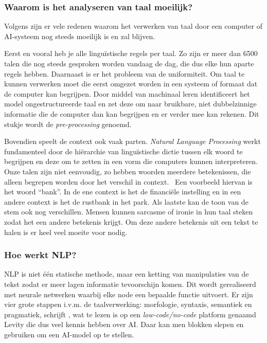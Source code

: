 \subsubsection{Waarom is het analyseren van taal moeilijk?}
Volgens \textcite{Kleinings2022} zijn er vele redenen waarom het verwerken van taal door een computer of AI-systeem nog steeds moeilijk is en zal blijven.

Eerst en vooral heb je alle linguïstische regels per taal. Zo zijn er meer dan 6500 talen die nog steeds gesproken worden vandaag de dag, die dus elke hun aparte regels hebben.
Daarnaast is er het probleem van de uniformiteit. Om taal te kunnen verwerken moet die eerst omgezet worden in een systeem of formaat dat de computer kan begrijpen. Door middel van machinaal leren identificeert het model ongestructureerde taal en zet deze om naar bruikbare, niet dubbelzinnige informatie die de computer dan kan begrijpen en er verder mee kan rekenen. Dit stukje wordt de \textit{pre-processing} genoemd.

Bovendien speelt de context ook vaak parten. \textit{Natural Language Processing} werkt fundamenteel door de hiërarchie van linguïstische dictie tussen elk woord te begrijpen en deze om te zetten in een vorm die computers kunnen interpreteren. Onze talen zijn niet eenvoudig, zo hebben woorden meerdere betekenissen, die alleen begrepen worden door het verschil in context.~\autocite{Kleinings2022} Een voorbeeld hiervan is het woord ``bank''. In de ene context is het de financiële instelling en in een andere context is het de rustbank in het park.
Als laatste kan de toon van de stem ook nog verschillen. Mensen kunnen sarcasme of ironie in hun taal steken zodat het een andere betekenis krijgt. Om deze andere betekenis uit een tekst te halen is er heel veel moeite voor nodig.

\subsubsection{Hoe werkt NLP?}
NLP is niet één statische methode, maar een ketting van manipulaties van de tekst zodat er meer lagen informatie tevoorschijn komen. Dit wordt gerealiseerd met neurale netwerken waarbij elke node een bepaalde functie uitvoert.
Er zijn vier grote stappen i.v.m. de taalverwerking: morfologie, syntaxis, semantiek en pragmatiek, schrijft \textcite{Kleinings2022}, wat te lezen is op een \textit{low-code/no-code} platform genaamd Levity die dus veel kennis hebben over AI. Daar kan men blokken slepen en gebruiken om een AI-model op te stellen.

